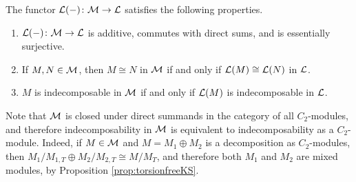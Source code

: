 \begin{prop}\label{prop:Lfunctorproperties}
  The functor ${\mathcal L}(-) \colon {\mathcal M} \rightarrow {\mathcal L}$ satisfies the following properties.
  \begin{enumerate}
    \item ${\mathcal L}(-) \colon {\mathcal M} \rightarrow {\mathcal L}$ is additive, commutes with direct sums, and is essentially surjective.
    \item If $M, N \in {\mathcal M}$, then $M \cong N$ in ${\mathcal M}$ if and only if ${\mathcal L}(M) \cong {\mathcal L}(N)$ in ${\mathcal L}$.
    \item $M$ is indecomposable in ${\mathcal M}$ if and only if ${\mathcal L}(M)$ is indecomposable in ${\mathcal L}$.
  \end{enumerate}
\end{prop}

\begin{remark}\label{rem:notionsofdecomp}
  Note that ${\mathcal M}$ is closed under direct summands in the category of all $C_2$-modules, and therefore indecomposability in ${\mathcal M}$ is equivalent to indecomposability as a $C_2$-module. Indeed, if $M \in {\mathcal M}$ and $M = M_1 \oplus M_2$ is a decomposition as $C_2$-modules, then $M_1 / M_{1, T} \oplus M_2 / M_{2, T} \cong M / M_T$, and therefore both $M_1$ and $M_2$ are mixed modules, by Proposition \ref{prop:torsionfreeKS}.
\end{remark}

